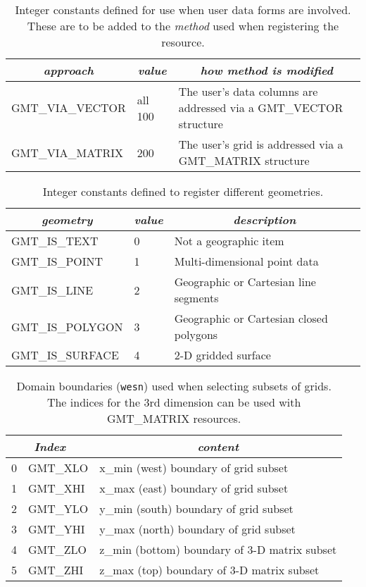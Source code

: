 \documentclass[11pt]{report}
\begin{document}
\begin{table}[h]
\small
\centering
\begin{tabular}{|l|l|l|} \hline
\multicolumn{1}{|c|}{\emph{approach}} & \multicolumn{1}{c|}{\emph{value}} & \multicolumn{1}{c|}{\emph{how method is modified}} \\ \hline
GMT\_VIA\_VECTOR	&all	100	&       The user's data columns are addressed via a GMT\_VECTOR structure \\ \hline
GMT\_VIA\_MATRIX	&	200	&       The user's grid is addressed via a GMT\_MATRIX structure \\ \hline
\end{tabular}
\caption{Integer constants defined for use when user data forms are involved.  These are to be added
to the \emph{method} used when registering the resource.}
\label{tbl:via}
\end{table}

\begin{table}[h]
\small
\centering
\begin{tabular}{|l|l|l|} \hline
\multicolumn{1}{|c|}{\emph{geometry}} & \multicolumn{1}{c|}{\emph{value}} & \multicolumn{1}{c|}{\emph{description}} \\ \hline
GMT\_IS\_TEXT		&	0	&       Not a geographic item \\ \hline
GMT\_IS\_POINT		&	1	&       Multi-dimensional point data \\ \hline
GMT\_IS\_LINE		&	2	&       Geographic or Cartesian line segments \\ \hline
GMT\_IS\_POLYGON	&	3	&       Geographic or Cartesian closed polygons \\ \hline
GMT\_IS\_SURFACE	&	4	&       2-D gridded surface \\ \hline
\end{tabular}
\caption{Integer constants defined to register different geometries.}
\label{tbl:geometry}
\end{table}

\begin{table}[h]
\small
\centering
\begin{tabular}{|c|l|l|} \hline
\multicolumn{2}{|c|}{\emph{Index}} & \multicolumn{1}{c|}{\emph{content}} \\ \hline
0 & GMT\_XLO	&       x\_min (west) boundary of grid subset  \\ \hline
1 & GMT\_XHI	&       x\_max (east) boundary of grid subset  \\ \hline
2 & GMT\_YLO	&       y\_min (south) boundary of grid subset  \\ \hline
3 & GMT\_YHI	&       y\_max (north) boundary of grid subset  \\ \hline
4 & GMT\_ZLO	&       z\_min (bottom) boundary of 3-D matrix subset  \\ \hline
5 & GMT\_ZHI	&       z\_max (top) boundary of 3-D matrix subset  \\ \hline
\end{tabular}
\caption{Domain boundaries (\texttt{wesn}) used when selecting subsets of grids.  The indices for
the 3rd dimension can be used with GMT\_MATRIX resources.}
\label{tbl:wesn}
\end{table}
\end{document}

